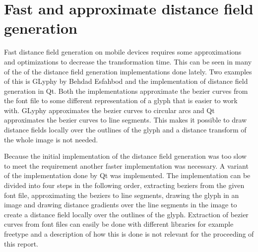 \section{Fast and approximate distance field generation}
Fast distance field generation on mobile devices requires some approximations and optimizations to decrease the transformation time. This can be seen in many of the of the distance field generation implementations done lately. Two examples of this is GLyphy by Behdad Esfahbod and the implementation of distance field generation in Qt. Both the implementations approximate the bezier curves from the font file to some different representation of a glyph that is easier to work with. GLyphy approximates the bezier curves to circular arcs and Qt approximates the bezier curves to line segments. This makes it possible to draw distance fields locally over the outlines of the glyph and a distance transform of the whole image is not needed.

Because the initial implementation of the distance field generation was too slow to meet the requirement another faster implementation was necessary. A variant of the implementation done by Qt was implemented. The implementation can be divided into four steps in the following order, extracting beziers from the given font file, approximating the beziers to line segments, drawing the glyph in an image and drawing distance gradients over the line segments in the image to create a distance field locally over the outlines of the glyph. Extraction of bezier curves from font files can easily be done with different libraries for example freetype and a description of how this is done is not relevant for the proceeding of this report. 
